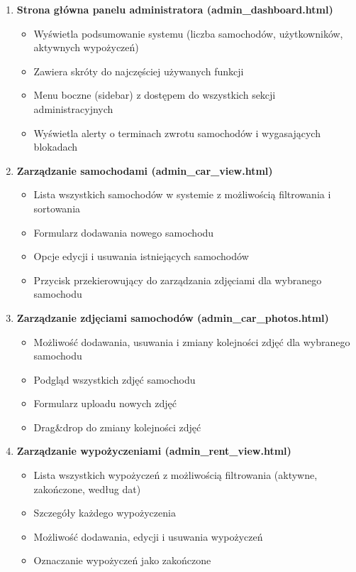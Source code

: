 \documentclass[12pt,a4paper]{article}
\begin{document}
\begin{enumerate}
    \item \textbf{Strona główna panelu administratora (admin\_dashboard.html)}
    \begin{itemize}
        \item Wyświetla podsumowanie systemu (liczba samochodów, użytkowników, aktywnych wypożyczeń)
        \item Zawiera skróty do najczęściej używanych funkcji
        \item Menu boczne (sidebar) z dostępem do wszystkich sekcji administracyjnych
        \item Wyświetla alerty o terminach zwrotu samochodów i wygasających blokadach
    \end{itemize}
    
    \item \textbf{Zarządzanie samochodami (admin\_car\_view.html)}
    \begin{itemize}
        \item Lista wszystkich samochodów w systemie z możliwością filtrowania i sortowania
        \item Formularz dodawania nowego samochodu
        \item Opcje edycji i usuwania istniejących samochodów
        \item Przycisk przekierowujący do zarządzania zdjęciami dla wybranego samochodu
    \end{itemize}
    
    \item \textbf{Zarządzanie zdjęciami samochodów (admin\_car\_photos.html)}
    \begin{itemize}
        \item Możliwość dodawania, usuwania i zmiany kolejności zdjęć dla wybranego samochodu
        \item Podgląd wszystkich zdjęć samochodu
        \item Formularz uploadu nowych zdjęć
        \item Drag\&drop do zmiany kolejności zdjęć
    \end{itemize}
    
    \item \textbf{Zarządzanie wypożyczeniami (admin\_rent\_view.html)}
    \begin{itemize}
        \item Lista wszystkich wypożyczeń z możliwością filtrowania (aktywne, zakończone, według dat)
        \item Szczegóły każdego wypożyczenia
        \item Możliwość dodawania, edycji i usuwania wypożyczeń
        \item Oznaczanie wypożyczeń jako zakończone
    \end{itemize}
    

\end{enumerate}
\end{document}
